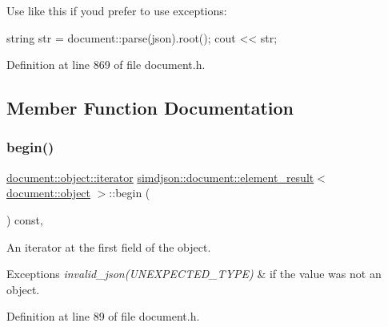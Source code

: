 Use like this if you\textquotesingle{}d prefer to use exceptions\+: \begin{DoxyVerb}string str = document::parse(json).root();
cout << str;\end{DoxyVerb}
 

Definition at line 869 of file document.\+h.



\subsection{Member Function Documentation}
\mbox{\label{classsimdjson_1_1document_1_1element__result_3_01document_1_1object_01_4_a56c21003eac07e4134fd13d0c7c753e5}} 
\subsubsection{\texorpdfstring{begin()}{begin()}}
{\footnotesize\ttfamily \hyperlink{classsimdjson_1_1document_1_1object_1_1iterator}{document\+::object\+::iterator} \hyperlink{classsimdjson_1_1document_1_1element__result}{simdjson\+::document\+::element\+\_\+result}$<$ \hyperlink{classsimdjson_1_1document_1_1object}{document\+::object} $>$\+::begin (\begin{DoxyParamCaption}{ }\end{DoxyParamCaption}) const\hspace{0.3cm}{\ttfamily [inline]}, {\ttfamily [noexcept]}}



An iterator at the first field of the object. 


\begin{DoxyExceptions}{Exceptions}
{\em invalid\+\_\+json(\+U\+N\+E\+X\+P\+E\+C\+T\+E\+D\+\_\+\+T\+Y\+P\+E)} & if the value was not an object. \\
\hline
\end{DoxyExceptions}


Definition at line 89 of file document.\+h.


